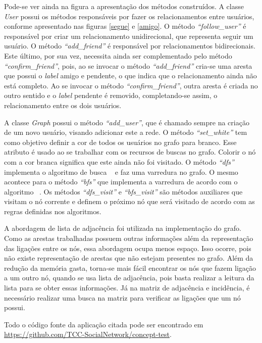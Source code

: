 Pode-se ver ainda na figura a apresentação dos métodos construídos. A classe \textit{User} possui os métodos responsáveis por fazer os relacionamentos entre usuários, conforme apresentado nas figuras \ref{segue} e \ref{amigo}. O método \textit{``follow\_user''} é responsável por criar um relacionamento unidirecional, que representa seguir um usuário. O método \textit{``add\_friend''} é responsável por relacionamentos bidirecionais. Este último, por sua vez, necessita ainda ser complementado pelo método \textit{``confirm\_friend''}, pois, ao se invocar o método \textit{``add\_friend''} cria-se uma aresta que possui o \textit{label} amigo e pendente, o que indica que o relacionamento ainda não está completo. Ao se invocar o método \textit{``confirm\_friend''}, outra aresta é criada no outro sentido e o \textit{label} pendente é removido, completando-se assim, o relacionamento entre os dois usuários.

A classe \textit{Graph} possui o método \textit{``add\_user''}, que é chamado sempre na criação de um novo usuário, visando adicionar este a rede. O método \textit{``set\_white''} tem como objetivo definir a cor de todos os usuários no grafo para branco. Esse atributo é usado ao se trabalhar com os recursos de buscas no grafo. Colorir o nó com a cor branca significa que este ainda não foi visitado. O método \textit{``dfs''} implementa o algoritmo de busca ~ e faz uma varredura no grafo. O mesmo acontece para o método \textit{``bfs''} que implementa a varredura de acordo com o algoritmo ~. Os métodos \textit{``dfs\_visit''} e \textit{``bfs\_visit''} são métodos auxiliares que visitam o nó corrente e definem o próximo nó que será visitado de acordo com as regras definidas nos algoritmos.

A abordagem de lista de adjacência foi utilizada na implementação do grafo. Como as arestas trabalhadas possuem outras informações além da representação das ligações entre os nós, essa abordagem ocupa menos espaço. Isso ocorre, pois não existe representação de arestas que não estejam presentes no grafo. Além da redução da memória gasta, torna-se mais fácil encontrar os nós que fazem ligação a um outro nó, quando se usa lista de adjacência, pois basta realizar a leitura da lista para se obter essas informações. Já na matriz de adjacência e incidência, é necessário realizar uma busca na matriz para verificar as ligações que um nó possui.

Todo o código fonte da aplicação citada pode ser encontrado em \url{https://github.com/TCC-SocialNetwork/concept-test}.

